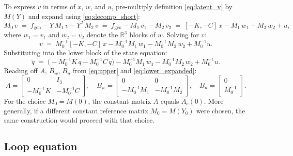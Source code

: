 \documentclass[11pt]{article}
\newcommand{\R}{\mathbb{R}}
\begin{document}
To express $v$ in terms of $x$, $w$, and $u$, pre-multiply definition \eqref{eq:latent_v}
by $M(Y)$ and expand using \eqref{eq:decomp_short}:
\begin{equation}
    M_0\,v \;=\; f_\mathrm{gen} - Y\,M_1\,v - Y^2\,M_2\,v
              \;=\; f_\mathrm{gen} - M_1\,v_1 - M_2\,v_2
              \;=\; [-K,-C]\,x - M_1\,w_1 - M_2\,w_2 + u,
    \label{eq:Mv_expand}
\end{equation}
where $w_1 = v_1$ and $w_2 = v_2$ denote the $\R^3$ blocks of $w$.
Solving for $v$:
\begin{equation}
    v \;=\; M_0^{-1}[-K,-C]\,x - M_0^{-1}M_1\,w_1 - M_0^{-1}M_2\,w_2 + M_0^{-1}u.
    \label{eq:v_expr}
\end{equation}
Substituting into the lower block of the state equation:
\begin{equation}
    \ddot{q} \;=\;
    \bigl(-M_0^{-1}K\,q - M_0^{-1}C\,\dot{q}\bigr)
    - M_0^{-1}M_1\,w_1 - M_0^{-1}M_2\,w_2
    + M_0^{-1}u.
    \label{eq:lower_expanded}
\end{equation}
Reading off $A$, $B_w$, $B_u$ from \eqref{eq:upper} and \eqref{eq:lower_expanded}:
\begin{equation}
    A = \begin{bmatrix} 0 & I_3 \\ -M_0^{-1}K & -M_0^{-1}C \end{bmatrix},
    \quad
    B_w = \begin{bmatrix} 0 & 0 \\ -M_0^{-1}M_1 & -M_0^{-1}M_2 \end{bmatrix},
    \quad
    B_u = \begin{bmatrix} 0 \\ M_0^{-1} \end{bmatrix}.
    \label{eq:state_mats}
\end{equation}
For the choice $M_0 = M(0)$, the constant matrix $A$ equals $A_c(0)$.
More generally, if a different constant reference matrix $M_0 = M(Y_0)$ were chosen,
the same construction would proceed with that choice.

\subsection{Loop equation}
\end{document}
